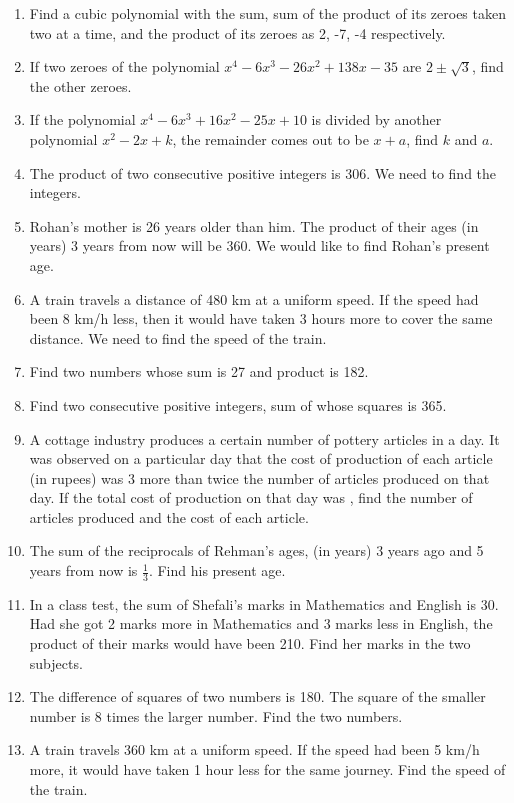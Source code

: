 \begin{enumerate}[label=\arabic*.,ref=\thesubsection.\theenumi]
\begin{enumerate}
\end{enumerate}
\item Find a cubic polynomial with the sum, sum of the product of its zeroes taken two at a time, and the product of its zeroes as 2, -7, -4 respectively.
\item If two zeroes of the polynomial $x^4-6x^3-26x^2+138x-35$ are $2\pm \sqrt{3}$, find the other zeroes.\item If the polynomial $x^4-6x^3+16x^2-25x+10$ is divided by another polynomial $x^2-2x+k$, the remainder comes out to be $x+a$, find $k$ and $a$.
\item The product of two consecutive positive integers is 306. We need to find the integers.
\item Rohan’s mother is 26 years older than him. The product of their ages (in years) 3 years from now will be 360. We would like to find Rohan’s present age.
\item A train travels a distance of 480 km at a uniform speed. If the speed had been 8 km/h less, then it would have taken 3 hours more to cover the same distance. We need to find the speed of the train.
\item Find two numbers whose sum is 27 and product is 182. 
\item  Find two consecutive positive integers, sum of whose squares is 365. 
\item  A cottage industry produces a certain number of pottery articles in a day. It was observed on a particular day that the cost of production of each article (in rupees) was 3 more than twice the number of articles produced on that day. If the total cost of production on that day was , find the number of articles produced and the cost of each article.\item The sum of the reciprocals of Rehman’s ages, (in years) 3 years ago and 5 years from now is $\frac{1}{3}$.  Find his present age.
\item In a class test, the sum of Shefali’s marks in Mathematics and English is 30. Had she got 2 marks more in Mathematics and 3 marks less in English, the product of their marks would have been 210. Find her marks in the two subjects.
\item The difference of squares of two numbers is 180. The square of the smaller number is 8 times the larger number. Find the two numbers.
\item A train travels 360 km at a uniform speed. If the speed had been 5 km/h more, it would have taken 1 hour less for the same journey. Find the speed of the train.

\end{enumerate}

